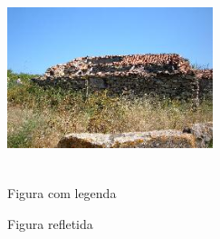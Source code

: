 \documentclass[a4paper,12pt]{article}
\begin{document}
%
%
%
%

\begin{figure}[h]
\begin{center}
\includegraphics[width=6cm,height=6cm,keepaspectratio]{dscf1683b_v1.jpg}
\end{center}
\caption{Figura com legenda}
\end{figure}

\begin{figure}[h]
\begin{center}
\end{center}
\caption{Figura refletida}
\end{figure}
\end{document}
